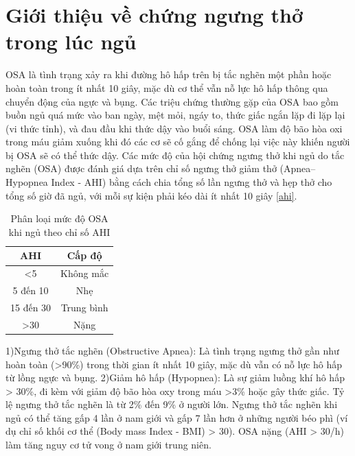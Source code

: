 
\section{Giới thiệu về chứng ngưng thở trong lúc ngủ}
\gls{OSA}\cite{osa_summary}\cite{ThaySYOSA} là tình trạng xảy ra khi đường hô hấp trên bị tắc nghẽn một phần hoặc hoàn toàn trong ít nhất 10 giây, mặc dù cơ thể vẫn nỗ lực hô hấp thông qua chuyển động của ngực và bụng. Các triệu chứng thường gặp của OSA bao gồm buồn ngủ quá mức vào ban ngày, mệt mỏi, ngáy to, thức giấc ngắn lặp đi lặp lại (vi thức tỉnh), và đau đầu khi thức dậy vào buổi sáng. OSA làm độ bão hòa oxi trong máu giảm xuống khi đó các cơ sẽ cố gắng để chống lại việc này khiến người bị OSA sẽ có thể thức dậy. Các mức độ của hội chứng ngưng thở khi ngủ do tắc nghẽn (OSA) được đánh giá dựa trên chỉ số ngưng thở giảm thở (Apnea–Hypopnea Index - AHI) bằng cách chia tổng số lần ngưng thở và hẹp thở cho tổng số giờ đã ngủ, với mỗi sự kiện phải kéo dài ít nhất 10 giây \ref{ahi}.

\begin{table}[h!]
\caption{\texorpdfstring{Phân loại mức độ OSA khi ngủ theo chỉ số AHI}{Phân loại OSA}}
\label{ahi}
\vspace{-3mm}
\begin{center}
\begin{tabular}{|c|c|}
\hline
AHI & Cấp độ \\
\hline
<5 & Không mắc \\
5 đến 10 & Nhẹ \\
15 đến 30 & Trung bình \\
>30 & Nặng \\
\hline
\end{tabular}
\label{tab1}
\end{center}
\end{table}


1)Ngưng thở tắc nghẽn (Obstructive Apnea): Là tình trạng ngưng thở gần như hoàn toàn (>90\%) trong thời gian ít nhất 10 giây, mặc dù vẫn có nỗ lực hô hấp từ lồng ngực và bụng. 2)Giảm hô hấp (Hypopnea): Là sự giảm luồng khí hô hấp > 30\%, đi kèm với giảm độ bão hòa oxy trong máu >3\% hoặc gây thức giấc. Tỷ lệ ngưng thở tắc nghẽn là từ 2\% đến 9\% ở người lớn. Ngưng thở tắc nghẽn khi ngủ có thể tăng gấp 4 lần ở nam giới và gấp 7 lần hơn ở những người béo phì (ví dụ chỉ số khối cơ thể (Body mass Index - BMI) > 30). OSA nặng (AHI > 30/h) làm tăng nguy cơ tử vong ở nam giới trung niên.

